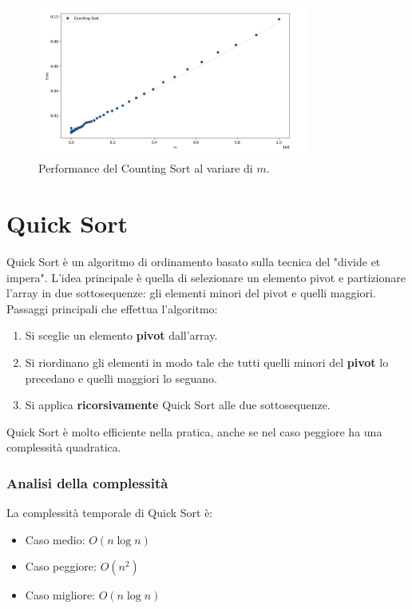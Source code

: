 \documentclass[a4paper, 12pt, oneside]{book}
\begin{document}
\begin{figure}[H]
    \centering
    \includegraphics[width=0.8\textwidth]{images/grafico_counting_sort_m.png}
    \caption{Performance del Counting Sort al variare di \(m\).}
    \label{fig:counting_sort_m}
\end{figure}


\chapter{Quick Sort}\label{chap:Quick Sort} %

Quick Sort è un algoritmo di ordinamento basato sulla tecnica del "divide et impera". L'idea principale è quella di selezionare un elemento pivot e partizionare l'array in due sottosequenze: gli elementi minori del pivot e quelli maggiori. Passaggi principali che effettua l'algoritmo:

\begin{enumerate}
	\item Si sceglie un elemento \textbf{pivot} dall'array.
	\item Si riordinano gli elementi in modo tale che tutti quelli minori del \textbf{pivot} lo precedano e quelli maggiori lo seguano.
	\item Si applica \textbf{ricorsivamente} Quick Sort alle due sottosequenze.
\end{enumerate}

\noindent Quick Sort è molto efficiente nella pratica, anche se nel caso peggiore ha una complessità quadratica.

\subsection*{Analisi della complessità}

La complessità temporale di Quick Sort è:
\begin{itemize}
	\item Caso medio: \(O(n \log n)\) 
	\item Caso peggiore: \(O(n^2)\)
	\item Caso migliore: \(O(n \log n)\)
\end{itemize}
\end{document}
